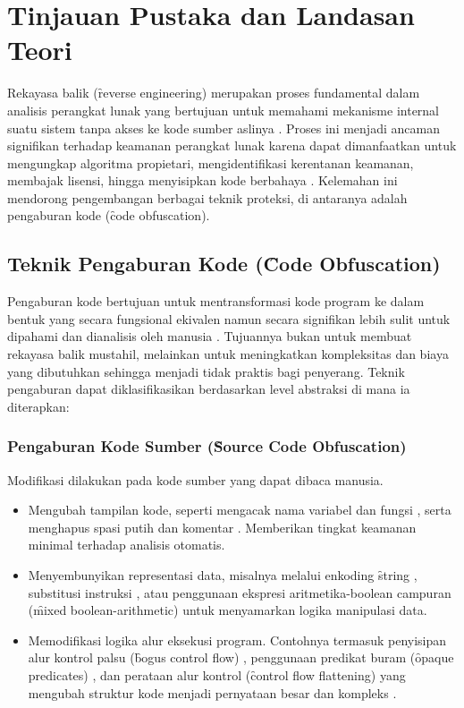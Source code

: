 \section{Tinjauan Pustaka dan Landasan Teori} %

Rekayasa balik (\f{reverse engineering}) merupakan proses fundamental dalam analisis perangkat lunak yang bertujuan untuk memahami mekanisme internal suatu sistem tanpa akses ke kode sumber aslinya \cite{Has18, gee24}. Proses ini menjadi ancaman signifikan terhadap keamanan perangkat lunak karena dapat dimanfaatkan untuk mengungkap algoritma propietari, mengidentifikasi kerentanan keamanan, membajak lisensi, hingga menyisipkan kode berbahaya \cite{Wak24}. Kelemahan ini mendorong pengembangan berbagai teknik proteksi, di antaranya adalah pengaburan kode (\f{code obfuscation}).

\subsection{Teknik Pengaburan Kode (\f{Code Obfuscation})}
Pengaburan kode bertujuan untuk mentransformasi kode program ke dalam bentuk yang secara fungsional ekivalen namun secara signifikan lebih sulit untuk dipahami dan dianalisis oleh manusia \cite{Jin24}. Tujuannya bukan untuk membuat rekayasa balik mustahil, melainkan untuk meningkatkan kompleksitas dan biaya yang dibutuhkan sehingga menjadi tidak praktis bagi penyerang. Teknik pengaburan dapat diklasifikasikan berdasarkan level abstraksi di mana ia diterapkan:

\subsubsection{Pengaburan Kode Sumber (\f{Source Code Obfuscation})}
Modifikasi dilakukan pada kode sumber yang dapat dibaca manusia.
\begin{itemize}
    \item {} Mengubah tampilan kode, seperti mengacak nama variabel dan fungsi \cite{Cha04}, serta menghapus spasi putih dan komentar \cite{Bal11}. Memberikan tingkat keamanan minimal terhadap analisis otomatis.
    \item {} Menyembunyikan representasi data, misalnya melalui enkoding \f{string} \cite{Ert05, Fuk08, Kov13}, substitusi instruksi \cite{LeD12, Dar10}, atau penggunaan ekspresi aritmetika-boolean campuran (\f{mixed boolean-arithmetic}) \cite{Liu21, Sch22, Zho07} untuk menyamarkan logika manipulasi data.
    \item {} Memodifikasi logika alur eksekusi program. Contohnya termasuk penyisipan alur kontrol palsu (\f{bogus control flow}) \cite{LiY211}, penggunaan predikat buram (\f{opaque predicates}) \cite{XuD16}, dan perataan alur kontrol (\f{control flow flattening}) yang mengubah struktur kode menjadi pernyataan  besar dan kompleks \cite{Lás09}.
\end{itemize}

